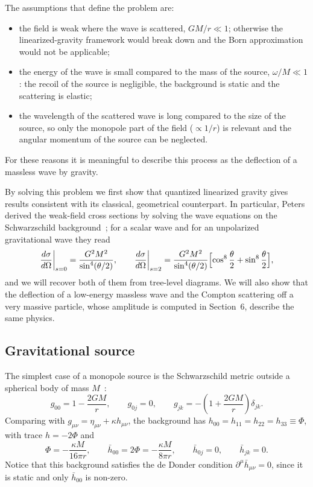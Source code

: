 \documentclass[12pt,a4paper,oneside]{article}
\numberwithin{equation}{section}   %
\begin{document}
The assumptions that define the problem are:
\begin{itemize}
\item the field is weak where the wave is scattered, $GM/r\ll1$;
otherwise the linearized-gravity framework would break down and the Born
approximation would not be applicable;
\item the energy of the wave is small compared to the mass of the source,
$\omega/M\ll1$: the recoil of the source is negligible, the background is
static and the scattering is elastic;
\item the wavelength of the scattered wave is long compared to the size of
the source, so only the monopole part of the field ($\propto1/r$) is
relevant and the angular momentum of the source can be neglected.
\end{itemize}
For these reasons it is meaningful to describe this process as the
deflection of a massless wave by gravity. 


By solving this problem we first show that quantized linearized gravity
gives results consistent with its classical, geometrical counterpart. In
particular, Peters derived the weak-field cross sections by solving the
wave equations on the Schwarzschild background~\cite{Peters1976}; for a
scalar wave and for an unpolarized gravitational wave they read
\begin{equation}
    \label{eq:peters}
    \frac{d\sigma}{d\Omega}\bigg|_{s=0}
    =\frac{G^2M^2}{\sin^{4}(\theta/2)},
    \qquad
    \frac{d\sigma}{d\Omega}\bigg|_{s=2}
    =\frac{G^2M^2}{\sin^{4}(\theta/2)}
    \Bigl[\cos^{8}\frac{\theta}{2}+\sin^{8}\frac{\theta}{2}\Bigr],
\end{equation}
and we will recover both of them from tree-level diagrams.
We will also show that the deflection of a low-energy massless wave and the
Compton scattering off a very massive particle, whose amplitude is computed
in Section~6, describe the same physics.

\subsection{Gravitational source}
The simplest case of a monopole source is the
Schwarzschild metric outside a spherical body of mass $M$~\cite{Weinberg1972}:
\begin{equation}
    \label{eq:metric-schw}
    g_{00} = 1-\frac{2GM}{r}, \qquad
    g_{0j} = 0, \qquad
    g_{jk} = -\left(1+\frac{2GM}{r}\right)\delta_{jk}.
\end{equation}
Comparing with $g_{\mu\nu}=\eta_{\mu\nu}+\kappa h_{\mu\nu}$, the background has
$h_{00}=h_{11}=h_{22}=h_{33}\equiv\Phi$, with trace $h=-2\Phi$ and
\begin{equation}
    \label{eq:hbar-schw}
    \Phi=-\frac{\kappa M}{16\pi r},\qquad
    \bar h_{00}=2\Phi=-\frac{\kappa M}{8\pi r},\qquad \bar h_{0j}=0,\qquad \bar h_{jk}=0 .
\end{equation}
Notice that this background satisfies the de Donder condition
$\partial^\mu\bar h_{\mu\nu}=0$, since it is static and only $\bar h_{00}$ is
non-zero.
\end{document}
